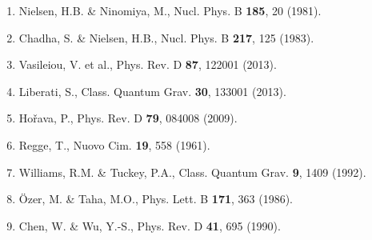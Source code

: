 \documentclass[a4paper,11pt]{article}
\theoremstyle{plain}
\begin{document}
\begin{enumerate}
\item Nielsen, H.B. \& Ninomiya, M., Nucl. Phys. B \textbf{185}, 20 (1981).
\item Chadha, S. \& Nielsen, H.B., Nucl. Phys. B \textbf{217}, 125 (1983).
\item Vasileiou, V. et al., Phys. Rev. D \textbf{87}, 122001 (2013).
\item Liberati, S., Class. Quantum Grav. \textbf{30}, 133001 (2013).
\item Ho\v{r}ava, P., Phys. Rev. D \textbf{79}, 084008 (2009).
\item Regge, T., Nuovo Cim. \textbf{19}, 558 (1961).
\item Williams, R.M. \& Tuckey, P.A., Class. Quantum Grav. \textbf{9}, 1409 (1992).
\item \"Ozer, M. \& Taha, M.O., Phys. Lett. B \textbf{171}, 363 (1986).
\item Chen, W. \& Wu, Y.-S., Phys. Rev. D \textbf{41}, 695 (1990).
\end{enumerate}
\end{document}
